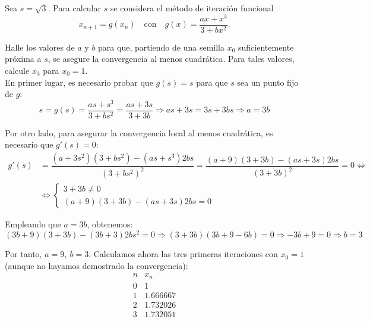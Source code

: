\begin{ejercicio}\label{ej:1.1.9}
    Sea $s = \sqrt{3}$. Para calcular $s$ se considera el método de iteración funcional 
    \begin{equation*}
        x_{n+1} = g(x_n) \quad \text{con} \quad g(x) = \dfrac{ax + x^3}{3 + bx^2}.
    \end{equation*}

    Halle los valores de $a$ y $b$ para que, partiendo de una semilla $x_0$ suficientemente próxima a $s$, se asegure la convergencia al menos cuadrática. Para tales valores, calcule $x_3$ para $x_0 = 1$.\\

    En primer lugar, es necesario probar que $g(s)=s$ para que $s$ sea un punto fijo de $g$:
    \begin{equation*}
        s = g\left(s\right)=\dfrac{as+s^3}{3+bs^2} = \dfrac{as+3s}{3+3b}
        \Longrightarrow as+3s=3s+3bs
        \Longrightarrow a=3b
    \end{equation*}

    Por otro lado, para asegurar la convergencia local al menos cuadrática, es necesario que $g'(s)=0$:
    \begin{align*}
        g'(s)&=\dfrac{(a+3s^2)(3+bs^2)-(as+s^3)2bs}{(3+bs^2)^2}
        = \dfrac{(a+9)(3+3b)-(as+3s)2bs}{(3+3b)^2}=0\iff\\&\iff \begin{cases}
            3+3b\neq 0\\
            (a+9)(3+3b)-(as+3s)2bs=0
        \end{cases}
    \end{align*}

    Empleando que $a=3b$, obtenemos:
    \begin{equation*}
        (3b+9)(3+3b)-(3b+3)2bs^2=0
        \Longrightarrow (3+3b)(3b+9-6b)=0\Longrightarrow -3b+9=0\Longrightarrow b=3
    \end{equation*}

    Por tanto, $a=9,~b=3$. Calculamos ahora las tres primeras iteraciones con $x_0=1$ (aunque no hayamos demostrado la convergencia):
    \begin{equation*}
        \begin{array}{c|c}
            n & x_n\\ \hline
            0 & 1\\
            1 & 1.666667\\
            2 & 1.732026\\
            3 & 1.732051
        \end{array}
    \end{equation*}
\end{ejercicio}

